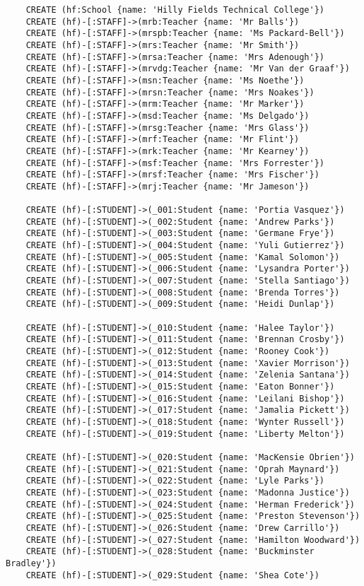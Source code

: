 	\begin{lstlisting}
	CREATE (hf:School {name: 'Hilly Fields Technical College'})
	CREATE (hf)-[:STAFF]->(mrb:Teacher {name: 'Mr Balls'})
	CREATE (hf)-[:STAFF]->(mrspb:Teacher {name: 'Ms Packard-Bell'})
	CREATE (hf)-[:STAFF]->(mrs:Teacher {name: 'Mr Smith'})
	CREATE (hf)-[:STAFF]->(mrsa:Teacher {name: 'Mrs Adenough'})
	CREATE (hf)-[:STAFF]->(mrvdg:Teacher {name: 'Mr Van der Graaf'})
	CREATE (hf)-[:STAFF]->(msn:Teacher {name: 'Ms Noethe'})
	CREATE (hf)-[:STAFF]->(mrsn:Teacher {name: 'Mrs Noakes'})
	CREATE (hf)-[:STAFF]->(mrm:Teacher {name: 'Mr Marker'})
	CREATE (hf)-[:STAFF]->(msd:Teacher {name: 'Ms Delgado'})
	CREATE (hf)-[:STAFF]->(mrsg:Teacher {name: 'Mrs Glass'})
	CREATE (hf)-[:STAFF]->(mrf:Teacher {name: 'Mr Flint'})
	CREATE (hf)-[:STAFF]->(mrk:Teacher {name: 'Mr Kearney'})
	CREATE (hf)-[:STAFF]->(msf:Teacher {name: 'Mrs Forrester'})
	CREATE (hf)-[:STAFF]->(mrsf:Teacher {name: 'Mrs Fischer'})
	CREATE (hf)-[:STAFF]->(mrj:Teacher {name: 'Mr Jameson'})
	
	CREATE (hf)-[:STUDENT]->(_001:Student {name: 'Portia Vasquez'})
	CREATE (hf)-[:STUDENT]->(_002:Student {name: 'Andrew Parks'})
	CREATE (hf)-[:STUDENT]->(_003:Student {name: 'Germane Frye'})
	CREATE (hf)-[:STUDENT]->(_004:Student {name: 'Yuli Gutierrez'})
	CREATE (hf)-[:STUDENT]->(_005:Student {name: 'Kamal Solomon'})
	CREATE (hf)-[:STUDENT]->(_006:Student {name: 'Lysandra Porter'})
	CREATE (hf)-[:STUDENT]->(_007:Student {name: 'Stella Santiago'})
	CREATE (hf)-[:STUDENT]->(_008:Student {name: 'Brenda Torres'})
	CREATE (hf)-[:STUDENT]->(_009:Student {name: 'Heidi Dunlap'})
	
	CREATE (hf)-[:STUDENT]->(_010:Student {name: 'Halee Taylor'})
	CREATE (hf)-[:STUDENT]->(_011:Student {name: 'Brennan Crosby'})
	CREATE (hf)-[:STUDENT]->(_012:Student {name: 'Rooney Cook'})
	CREATE (hf)-[:STUDENT]->(_013:Student {name: 'Xavier Morrison'})
	CREATE (hf)-[:STUDENT]->(_014:Student {name: 'Zelenia Santana'})
	CREATE (hf)-[:STUDENT]->(_015:Student {name: 'Eaton Bonner'})
	CREATE (hf)-[:STUDENT]->(_016:Student {name: 'Leilani Bishop'})
	CREATE (hf)-[:STUDENT]->(_017:Student {name: 'Jamalia Pickett'})
	CREATE (hf)-[:STUDENT]->(_018:Student {name: 'Wynter Russell'})
	CREATE (hf)-[:STUDENT]->(_019:Student {name: 'Liberty Melton'})
	
	CREATE (hf)-[:STUDENT]->(_020:Student {name: 'MacKensie Obrien'})
	CREATE (hf)-[:STUDENT]->(_021:Student {name: 'Oprah Maynard'})
	CREATE (hf)-[:STUDENT]->(_022:Student {name: 'Lyle Parks'})
	CREATE (hf)-[:STUDENT]->(_023:Student {name: 'Madonna Justice'})
	CREATE (hf)-[:STUDENT]->(_024:Student {name: 'Herman Frederick'})
	CREATE (hf)-[:STUDENT]->(_025:Student {name: 'Preston Stevenson'})
	CREATE (hf)-[:STUDENT]->(_026:Student {name: 'Drew Carrillo'})
	CREATE (hf)-[:STUDENT]->(_027:Student {name: 'Hamilton Woodward'})
	CREATE (hf)-[:STUDENT]->(_028:Student {name: 'Buckminster Bradley'})
	CREATE (hf)-[:STUDENT]->(_029:Student {name: 'Shea Cote'})
	

\end{lstlisting}
